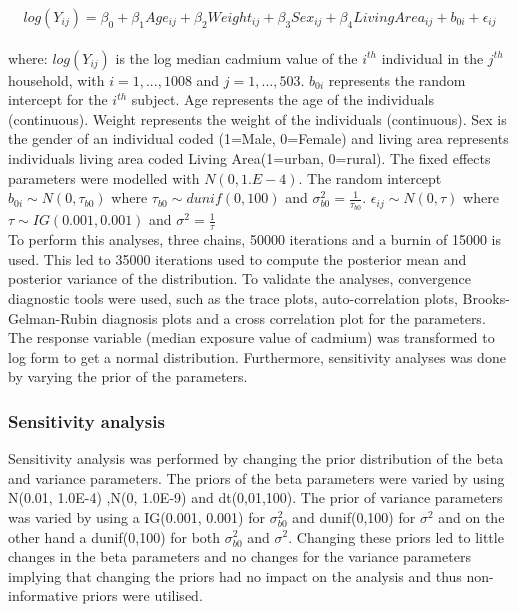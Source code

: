 \documentclass[11pt]{article}
\begin{document}
$$log(Y_{ij}) = \beta_{0} +  \beta_{1}Age_{ij} + \beta_{2}Weight_{ij} + \beta_{3}Sex_{ij} +\beta_{4}Living Area_{ij} + b_{0i} + \epsilon_{ij}$$
\\
where: $log(Y_{ij})$ is the log median cadmium value of the $i^{th}$ individual in the $j^{th}$ household, with $i=1,...,1008$ and $j=1,...,503$. $b_{0i}$ represents the random intercept for the $i^{th}$ subject. Age represents the age of the individuals (continuous). Weight represents the weight of the individuals (continuous). Sex is the gender of an individual coded (1=Male, 0=Female) and living area represents individuals living area coded Living Area(1=urban, 0=rural). The fixed effects parameters were modelled with $N(0,1.E-4)$. The random intercept $b_{0i} \sim N(0,\tau_{b0})$ where $\tau_{b0} \sim dunif(0,100)$ and $\sigma_{b0}^{2} = \frac{1}{\tau_{b0}}$. 
$\epsilon_{ij} \sim N(0, \tau)$ where $\tau  \sim IG(0.001, 0.001)$ and $\sigma^{2} = \frac{1}{\tau}$ 
\\
To perform this analyses, three chains, 50000 iterations and a burnin of 15000 is used. This led to 35000 iterations used to compute the posterior mean and posterior variance of the distribution. To validate the analyses, convergence diagnostic tools were used, such as the trace plots, auto-correlation plots, Brooks-Gelman-Rubin diagnosis plots and a cross correlation plot for the parameters. The response variable (median exposure value of cadmium) was transformed to log form to get a normal distribution. Furthermore,  sensitivity analyses was done by varying the prior of the parameters.


\subsubsection{Sensitivity analysis}
 Sensitivity analysis was performed by changing the prior distribution of the beta and variance parameters. The priors of the beta parameters were varied by using  N(0.01, 1.0E-4) ,N(0, 1.0E-9) and dt(0,01,100). The prior of variance parameters was varied by using a IG(0.001, 0.001) for $\sigma_{b0}^{2}$ and dunif(0,100) for $\sigma^{2}$ and on the other hand a dunif(0,100) for both $\sigma_{b0}^{2}$ and $\sigma^{2}$. Changing these priors led to little changes in the beta parameters and no changes for the variance parameters implying that changing the priors had no impact on the analysis and thus non-informative priors were utilised.

 
\end{document}
